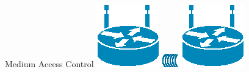 \documentclass{beamer}
\begin{document}
\begin{frame}{Medium Access Control}
	\includegraphics[width=0.2\linewidth]{wireless.eps}
	\includegraphics[width=0.2\linewidth,angle=180,origin=c]{wave.eps}
	\hfill
	\includegraphics[width=0.2\linewidth]{wireless.eps}
\end{frame}
\end{document}
